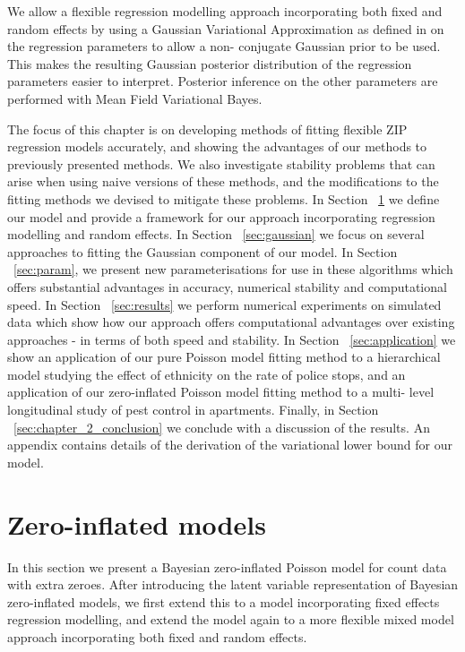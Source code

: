 We allow a flexible regression modelling approach incorporating both fixed and
random effects by using a Gaussian Variational Approximation as defined in
\cite{Ormerod2012} on the regression parameters to allow a non- conjugate
Gaussian prior to be used. This makes the resulting Gaussian posterior
distribution of the regression parameters easier to interpret. Posterior
inference on the other parameters are performed with Mean Field Variational
Bayes.


The focus of this chapter is on developing methods of fitting flexible ZIP
regression models accurately, and showing the advantages of our methods to
previously presented methods. We also investigate stability problems that can
arise when using naive versions of these methods, and the modifications to the
fitting methods we devised to mitigate these problems. In Section
~\ref{sec:zero_inflated_model} we define our model and provide a framework for
our approach incorporating regression modelling and random effects. In Section
~\ref{sec:gaussian} we focus on several approaches to fitting the Gaussian
component of our model. In Section ~\ref{sec:param}, we present new
parameterisations for use in these algorithms which offers substantial
advantages in accuracy, numerical stability and computational speed. In Section
~\ref{sec:results} we perform numerical experiments on simulated data which
show how our approach offers computational advantages over existing approaches
- in terms of both speed and stability. In Section ~\ref{sec:application} we
show an application of our pure Poisson model fitting method to a hierarchical
model studying the effect of ethnicity on the rate of police stops, and an
application of our zero-inflated Poisson model fitting method to a multi- level
longitudinal study of pest control in apartments. Finally, in Section
~\ref{sec:chapter_2_conclusion} we conclude with a discussion of the results.
An appendix contains details of the derivation of the variational lower bound
for our model.

\section{Zero-inflated models}
\label{sec:zero_inflated_model}

In this section we present a Bayesian zero-inflated Poisson model for count
data with extra zeroes. After introducing the latent variable representation of
Bayesian zero-inflated models, we first extend this to a model incorporating
fixed effects regression modelling, and extend the model again to a more
flexible mixed model approach incorporating both fixed and random effects.

